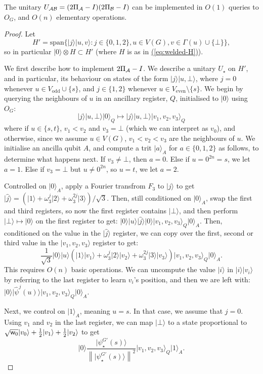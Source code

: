 \documentclass{article}
\newcommand{\eq}[1]{\hyperref[eq:#1]{(\ref*{eq:#1})}}
\def\ket#1{{\lvert}#1\rangle}
\renewcommand{\>}{\rangle}
\newcommand{\<}{\langle}
\renewcommand{\(}{\left(}
\renewcommand{\)}{\right)}
\def\norm#1{\left\| #1 \right\|}
\def\w{{\sf w}}
\begin{document}
\begin{lemma}\label{lem:welded-U}
The unitary $U_{\cal AB}=(2\Pi_{\cal A}-I)(2\Pi_{\cal B}-I)$ can be implemented in $O(1)$ queries to $O_G$, and $O(n)$ elementary operations.
\end{lemma}
\begin{proof}
Let 
$$H'=\mathrm{span}\{\ket{j}\ket{u,v}:j\in\{0,1,2\},u\in V(G),v\in \Gamma(u)\cup\{\bot\}\},$$
so in particular $\ket{0}\otimes H\subset H'$ (where $H$ is as in \eq{welded-H}).

We first describe how to implement $2\Pi_{\cal A}-I$. 
We describe a unitary $U_\star$ on $H'$, and in particular, its behaviour on states of the form $\ket{j}\ket{u,\bot}$, where $j=0$ whenever $u\in V_{\mathrm{odd}}\cup\{s\}$, and $j\in\{1,2\}$ whenever $u\in V_{\mathrm{even}}\setminus \{s\}$. We begin by querying the neighbours of $u$ in an ancillary register, $Q$, initialised to $\ket{0}$ using $O_G$:
$$\ket{j}\ket{u,\bot}\ket{0}_Q\mapsto \ket{j}\ket{u,\bot}\ket{v_1,v_2,v_3}_Q$$
where if $u\in \{s,t\}$, $v_1<v_2$ and $v_3=\bot$ (which we can interpret as $v_0$), and otherwise, since we assume $u\in V(G)$, $v_1<v_2<v_3$ are the neighbours of $u$. 
We initialise an ancilla qubit $A$, and compute a trit $\ket{a}_A$ for $a\in\{0,1,2\}$ as follows, to determine what happens next. If $v_3\neq \bot$, then $a=0$. Else if $u=0^{2n}=s$, we let $a=1$. Else if $v_3=\bot$ but $u\neq 0^{2n}$, so $u=t$, we let $a=2$. 

Controlled on $\ket{0}_A$, apply a Fourier transfrom $F_3$ to $\ket{j}$ to get $\ket{\hat{j}}=(\ket{1}+\omega_3^j\ket{2}+\omega_3^{2j}\ket{3})/\sqrt{3}$. Then, still conditioned on $\ket{0}_A$, swap the first and third registers, so now the first register contains $\ket{\bot}$, and then perform $\ket{\bot}\mapsto \ket{0}$ on the first register to get:
$\ket{0}\ket{u}\ket{\hat{j}}\ket{0}\ket{v_1,v_2,v_3}_Q\ket{0}_A.$
Then, conditioned on the value in the $\ket{\hat{j}}$ register, we can copy over the first, second or third value in the $\ket{v_1,v_2,v_3}$ register to get:
$$\frac{1}{\sqrt{3}}\ket{0}\ket{u}\left(\ket{1}\ket{v_1}+\omega_3^j\ket{2}\ket{v_2}+\omega_3^{2j}\ket{3}\ket{v_3}\right)\ket{v_1,v_2,v_3}_Q\ket{0}_A.$$
This requires $O(n)$ basic operations. 
We can uncompute the value $\ket{i}$ in $\ket{i}\ket{v_i}$ by referring to the last register to learn $v_i$'s position, and then we are left with:
$\ket{0}\ket{\widehat{\psi}^j(u)}\ket{v_1,v_2,v_3}_Q\ket{0}_A.$

Next, we control on $\ket{1}_A$, meaning $u=s$. In that case, we assume that $j=0$. 
Using $v_1$ and $v_2$ in the last register, we can map $\ket{\bot}$ to a state proportional to 
$\sqrt{\w_0}\ket{v_0}+\frac{1}{2}\ket{v_1}+\frac{1}{2}\ket{v_2}$
to get
$$\ket{0}\frac{\ket{{\psi}^{G'}_\star(s)}}{\norm{\ket{{\psi}^{G'}_\star(s)}}^2}\ket{v_1,v_2,v_3}_Q\ket{1}_A.$$


\end{proof}
\end{document}
